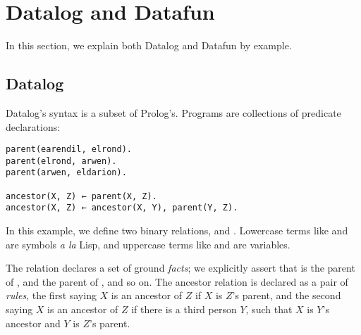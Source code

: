 \section{Datalog and Datafun}
\label{sec:datalog-and-datafun}

In this section, we explain both Datalog and Datafun by example.

\subsection{Datalog}

Datalog's syntax is a subset of Prolog's. Programs
are collections of predicate declarations:
\begin{verbatim}
parent(earendil, elrond).
parent(elrond, arwen).
parent(arwen, eldarion).

ancestor(X, Z) ← parent(X, Z).
ancestor(X, Z) ← ancestor(X, Y), parent(Y, Z).
\end{verbatim}

In this example, we define two binary relations, 
and . Lowercase terms like  and
 are symbols \emph{a la} Lisp, and uppercase terms like
 and  are variables.

The  relation declares a set of
ground \emph{facts}; we explicitly assert that  is
the parent of , and  the parent of
, and so on. The ancestor relation is declared as
a pair of \emph{rules}, the first saying
$X$ is an ancestor of $Z$ if $X$ is $Z$'s parent, and the second
saying $X$ is an ancestor of $Z$ if there is a third person
$Y$, such that $X$ is $Y$'s ancestor and $Y$ is $Z$'s parent.

% 

